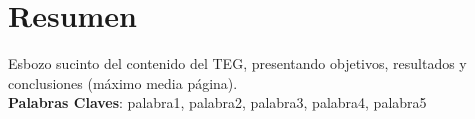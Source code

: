 \chapter*{Resumen}

Esbozo sucinto del contenido del TEG, presentando objetivos, resultados y conclusiones (m\'aximo media p\'agina). \\


\noindent \textbf{Palabras Claves}: palabra1, palabra2, palabra3, palabra4, palabra5